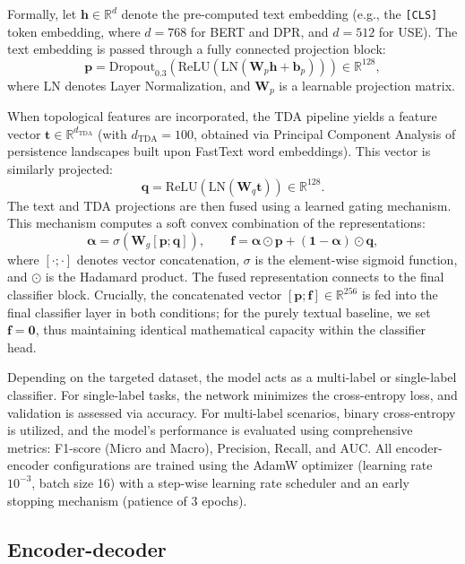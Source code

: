 \documentclass{article}
\begin{document}
Formally, let $\mathbf{h} \in \mathbb{R}^{d}$ denote the pre-computed text embedding (e.g., the \texttt{[CLS]} token embedding, where $d = 768$ for BERT and DPR, and $d = 512$ for USE). The text embedding is passed through a fully connected projection block:
\[
  \mathbf{p} = \mathrm{Dropout}_{0.3}\left(\mathrm{ReLU}\left(\mathrm{LN}(\mathbf{W}_p \mathbf{h} + \mathbf{b}_p)\right)\right) \in \mathbb{R}^{128},
\]
where $\mathrm{LN}$ denotes Layer Normalization, and $\mathbf{W}_p$ is a learnable projection matrix. 

When topological features are incorporated, the TDA pipeline yields a feature vector $\mathbf{t} \in \mathbb{R}^{d_{\mathrm{TDA}}}$ (with $d_{\mathrm{TDA}} = 100$, obtained via Principal Component Analysis of persistence landscapes built upon FastText word embeddings). This vector is similarly projected:
\[
  \mathbf{q} = \mathrm{ReLU}(\mathrm{LN}(\mathbf{W}_q \mathbf{t})) \in \mathbb{R}^{128}.
\]
The text and TDA projections are then fused using a learned gating mechanism. This mechanism computes a soft convex combination of the representations:
\[
  \boldsymbol{\alpha} = \sigma\left(\mathbf{W}_g [\mathbf{p};\mathbf{q}]\right), \qquad \mathbf{f} = \boldsymbol{\alpha} \odot \mathbf{p} + (\mathbf{1} - \boldsymbol{\alpha}) \odot \mathbf{q},
\]
where $[\cdot;\cdot]$ denotes vector concatenation, $\sigma$ is the element-wise sigmoid function, and $\odot$ is the Hadamard product. The fused representation connects to the final classifier block. Crucially, the concatenated vector $[\mathbf{p};\mathbf{f}] \in \mathbb{R}^{256}$ is fed into the final classifier layer in both conditions; for the purely textual baseline, we set $\mathbf{f} = \mathbf{0}$, thus maintaining identical mathematical capacity within the classifier head.

Depending on the targeted dataset, the model acts as a multi-label or single-label classifier. For single-label tasks, the network minimizes the cross-entropy loss, and validation is assessed via accuracy. For multi-label scenarios, binary cross-entropy is utilized, and the model's performance is evaluated using comprehensive metrics: F1-score (Micro and Macro), Precision, Recall, and AUC. All encoder-encoder configurations are trained using the AdamW optimizer (learning rate $10^{-3}$, batch size 16) with a step-wise learning rate scheduler and an early stopping mechanism (patience of 3 epochs).

\subsection{Encoder-decoder}
\end{document}
